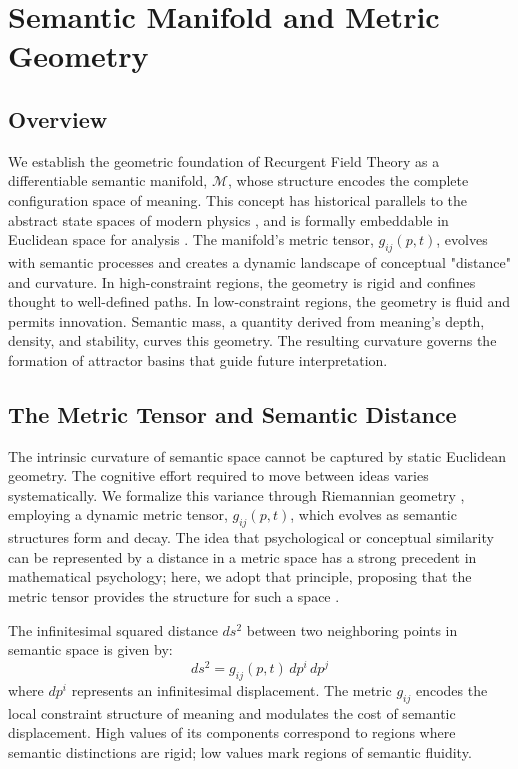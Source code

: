 \chapter{Semantic Manifold and Metric Geometry}\label{ch:semantic_manifold_geometry}

\section{Overview}

We establish the geometric foundation of Recurgent Field Theory as a differentiable semantic manifold, \(\mathcal{M}\), whose structure encodes the complete configuration space of meaning. This concept has historical parallels to the abstract state spaces of modern physics \autocite{vonNeumann1932}, and is formally embeddable in Euclidean space for analysis \autocite{Whitney1936}. The manifold's metric tensor, \(g_{ij}(p, t)\), evolves with semantic processes and creates a dynamic landscape of conceptual "distance" and curvature. In high-constraint regions, the geometry is rigid and confines thought to well-defined paths. In low-constraint regions, the geometry is fluid and permits innovation. Semantic mass, a quantity derived from meaning's depth, density, and stability, curves this geometry. The resulting curvature governs the formation of attractor basins that guide future interpretation.

\section{The Metric Tensor and Semantic Distance}

The intrinsic curvature of semantic space cannot be captured by static Euclidean geometry. The cognitive effort required to move between ideas varies systematically. We formalize this variance through Riemannian geometry \autocite{Riemann1868, doCarmo1992}, employing a dynamic metric tensor, \(g_{ij}(p,t)\), which evolves as semantic structures form and decay. The idea that psychological or conceptual similarity can be represented by a distance in a metric space has a strong precedent in mathematical psychology; here, we adopt that principle, proposing that the metric tensor provides the structure for such a space \autocite{Shepard1987}.

The infinitesimal squared distance \(ds^2\) between two neighboring points in semantic space is given by:
\begin{equation}
ds^2 = g_{ij}(p, t) \, dp^i \, dp^j
\end{equation}
where \(dp^i\) represents an infinitesimal displacement. The metric \(g_{ij}\) encodes the local constraint structure of meaning and modulates the cost of semantic displacement. High values of its components correspond to regions where semantic distinctions are rigid; low values mark regions of semantic fluidity.

